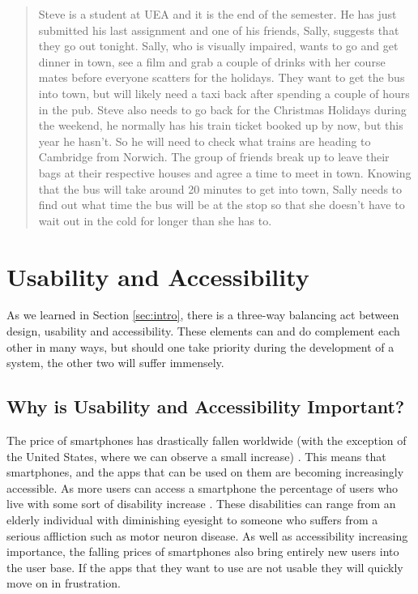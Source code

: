 \documentclass[cmpstyle]{ueacmpstyle}
\begin{document}
		\blockquote{Steve is a student at UEA and it is the end of the semester. He has just submitted his last assignment and one of his friends, Sally, suggests that they go out tonight. Sally, who is visually impaired, wants to go and get dinner in town, see a film and grab a couple of drinks with her course mates before everyone scatters for the holidays. They want to get the bus into town, but will likely need a taxi back after spending a couple of hours in the pub. Steve also needs to go back for the Christmas Holidays during the weekend, he normally has his train ticket booked up by now, but this year he hasn't. So he will need to check what trains are heading to Cambridge from Norwich. The group of friends break up to leave their bags at their respective houses and agree a time to meet in town. Knowing that the bus will take around 20 minutes to get into town, Sally needs to find out what time the bus will be at the stop so that she doesn't have to wait out in the cold for longer than she has to.}
	
	\section{Usability and Accessibility} \label{sec:UnA}
	As we learned in Section \ref{sec:intro}, there is a three-way balancing act between design, usability and accessibility. These elements can and do complement each other in many ways, but should one take priority during the development of a system, the other two will suffer immensely.
	
		\subsection{Why is Usability and Accessibility Important?} \label{sec:important} 
		The price of smartphones has drastically fallen worldwide (with the exception of the United States, where we can observe a small increase) \citep{smartphonePrice}. This means that smartphones, and the apps that can be used on them are becoming increasingly accessible. As more users can access a smartphone the percentage of users who live with some sort of disability increase \citep{ofcom}. These disabilities can range from an elderly individual with diminishing eyesight to someone who suffers from a serious affliction such as motor neuron disease. As well as accessibility increasing importance, the falling prices of smartphones also bring entirely new users into the user base. If the apps that they want to use are not usable they will quickly move on in frustration.
		
\end{document}
